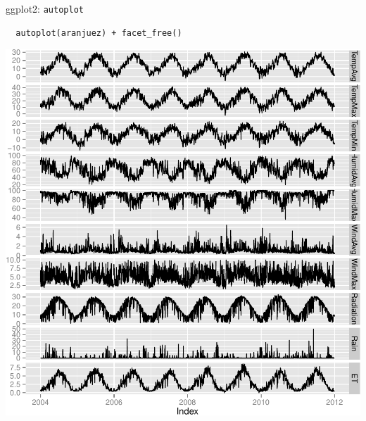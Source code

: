 \documentclass[xcolor={usenames,svgnames,dvipsnames}]{beamer}
\begin{document}
\begin{frame}[fragile,label=sec-2-2-3]{ggplot2: \texttt{autoplot}}
 \lstset{language=R,label= ,caption= ,numbers=none}
\begin{lstlisting}
  autoplot(aranjuez) + facet_free()
\end{lstlisting}
\end{frame}
\begin{frame}[label=sec-2-2-4]{}
\includegraphics[width=.9\linewidth]{figs/aranjuezGG.pdf}
\end{frame}
\end{document}
